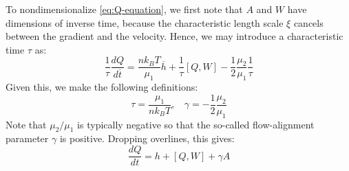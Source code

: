 \documentclass[reqno]{article}
\begin{document}
  To nondimensionalize \eqref{eq:Q-equation}, we first note that $A$ and $W$
  have dimensions of inverse time, because the characteristic length scale $\xi$
  cancels between the gradient and the velocity.
  Hence, we may introduce a characteristic time $\tau$ as:
  \begin{equation}
    \frac{1}{\tau} \frac{dQ}{d\overline{t}}
    =
    \frac{n k_B T}{\mu_1} \overline{h}
    + \frac{1}{\tau} [Q, W]
    - \frac12 \frac{\mu_2}{\mu_1} \frac{1}{\tau}
  \end{equation}
  Given this, we make the following definitions:
  \begin{equation}
    \tau = \frac{\mu_1}{n k_B T}, \:\:\:\:
    \gamma = -\frac12 \frac{\mu_2}{\mu_1}
  \end{equation}
  Note that $\mu_2/\mu_1$ is typically negative so that the so-called
  flow-alignment parameter $\gamma$ is positive.
  Dropping overlines, this gives:
  \begin{equation}
    \frac{dQ}{dt}
    =
    h + [Q, W] + \gamma A
  \end{equation}
\end{document}
